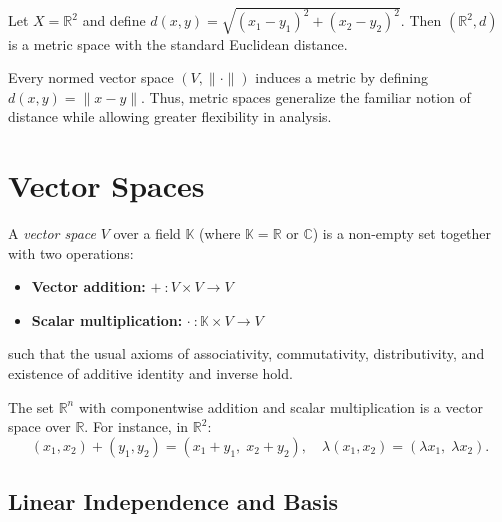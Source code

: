 \begin{example}
Let $X = \mathbb{R}^2$ and define $d(x,y) = \sqrt{(x_1-y_1)^2+(x_2-y_2)^2}$.  
Then $(\mathbb{R}^2,d)$ is a metric space with the standard Euclidean distance.
\end{example}

\begin{remark}
Every normed vector space $(V,\|\cdot\|)$ induces a metric by defining $d(x,y) = \|x-y\|$.  
Thus, metric spaces generalize the familiar notion of distance while allowing greater flexibility in analysis.
\end{remark}

\section{Vector Spaces}

\begin{definition}
A \emph{vector space} $V$ over a field $\mathbb{K}$ (where $\mathbb{K} = \mathbb{R}$ or $\mathbb{C}$) is a non-empty set together with two operations:
\begin{itemize}
    \item \textbf{Vector addition:} $+\ : V \times V \to V$
    \item \textbf{Scalar multiplication:} $\cdot\ : \mathbb{K} \times V \to V$
\end{itemize}
such that the usual axioms of associativity, commutativity, distributivity, and existence of additive identity and inverse hold.
\end{definition}

\begin{example}
The set $\mathbb{R}^n$ with componentwise addition and scalar multiplication is a vector space over $\mathbb{R}$.  
For instance, in $\mathbb{R}^2$:  
\begin{equation}
(x_1,x_2) + (y_1,y_2) = (x_1+y_1,\; x_2+y_2), \quad 
\lambda(x_1,x_2) = (\lambda x_1,\; \lambda x_2).
\end{equation}
\end{example}

\subsection{Linear Independence and Basis}

